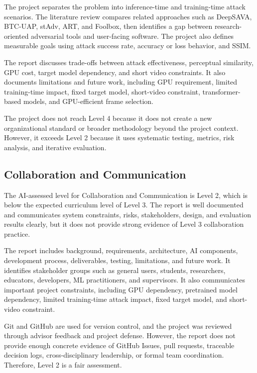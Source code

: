 The project separates the problem into inference-time and training-time
attack scenarios. The literature review compares related approaches
such as DeepSAVA, BTC-UAP, stAdv, ART, and Foolbox, then identifies a
gap between research-oriented adversarial tools and user-facing
software. The project also defines measurable goals using attack
success rate, accuracy or loss behavior, and SSIM.

The report discusses trade-offs between attack effectiveness,
perceptual similarity, GPU cost, target model dependency, and short
video constraints. It also documents limitations and future work,
including GPU requirement, limited training-time impact, fixed target
model, short-video constraint, transformer-based models, and
GPU-efficient frame selection.

The project does not reach Level 4 because it does not create a new
organizational standard or broader methodology beyond the project
context. However, it exceeds Level 2 because it uses systematic
testing, metrics, risk analysis, and iterative evaluation.

\subsection{Collaboration and Communication}
\label{subsection:collaboration-evaluation}

The AI-assessed level for Collaboration and Communication is Level 2,
which is below the expected curriculum level of Level 3. The report is
well documented and communicates system constraints, risks,
stakeholders, design, and evaluation results clearly, but it does not
provide strong evidence of Level 3 collaboration practice.

The report includes background, requirements, architecture, AI
components, development process, deliverables, testing, limitations,
and future work. It identifies stakeholder groups such as general
users, students, researchers, educators, developers, ML practitioners,
and supervisors. It also communicates important project constraints,
including GPU dependency, pretrained model dependency, limited
training-time attack impact, fixed target model, and short-video
constraint.

Git and GitHub are used for version control, and the project was
reviewed through advisor feedback and project defense. However, the
report does not provide enough concrete evidence of GitHub Issues,
pull requests, traceable decision logs, cross-disciplinary leadership,
or formal team coordination. Therefore, Level 2 is a fair assessment.

